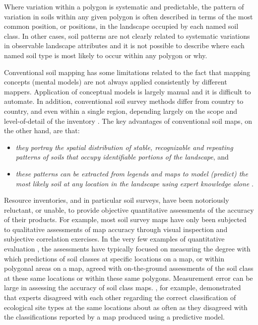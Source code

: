 \documentclass[11pt]{krantz}
\theoremstyle{definition}
\theoremstyle{definition}
\theoremstyle{definition}
\theoremstyle{remark}
\begin{document}
Where variation within a polygon is systematic and predictable, the
pattern of variation in soils within any given polygon is often
described in terms of the most common position, or positions, in the
landscape occupied by each named soil class. In other cases, soil
patterns are not clearly related to systematic variations in observable
landscape attributes and it is not possible to describe where each named
soil type is most likely to occur within any polygon or why.

Conventional soil mapping has some limitations related to the fact that
mapping concepts (mental models) are not always applied consistently by
different mappers. Application of conceptual models is largely manual
and it is difficult to automate. In addition, conventional soil survey
methods differ from country to country, and even within a single region,
depending largely on the scope and level-of-detail of the inventory
\citep{Schelling1970Geoderma, SSS1983USDA, Rossiter2001}. The key
advantages of conventional soil maps, on the other hand, are that:

\begin{itemize}
\item
  \emph{they portray the spatial distribution of stable, recognizable
  and repeating patterns of soils that occupy identifiable portions of
  the landscape}, and
\item
  \emph{these patterns can be extracted from legends and maps to model
  (predict) the most likely soil at any location in the landscape using
  expert knowledge alone} \citep{Zhu2001}.
\end{itemize}

Resource inventories, and in particular soil surveys, have been
notoriously reluctant, or unable, to provide objective quantitative
assessments of the accuracy of their products. For example, most soil
survey maps have only been subjected to qualitative assessments of map
accuracy through visual inspection and subjective correlation exercises.
In the very few examples of quantitative evaluation
\citep{Marsman1986ALTERRA, Finke2006Elsevier}, the assessments have
typically focused on measuring the degree with which predictions of soil
classes at specific locations on a map, or within polygonal areas on a
map, agreed with on-the-ground assessments of the soil class at these
same locations or within these same polygons. Measurement error can be
large in assessing the accuracy of soil class maps.
\citet{MacMillan2005CJSS}, for example, demonstrated that experts
disagreed with each other regarding the correct classification of
ecological site types at the same locations about as often as they
disagreed with the classifications reported by a map produced using a
predictive model.
\end{document}
